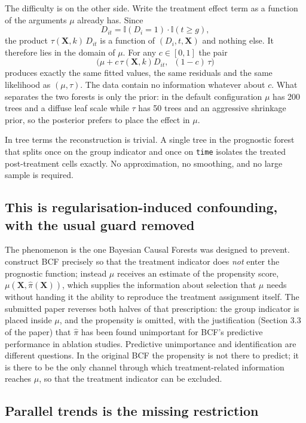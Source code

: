 \documentclass[11pt]{article}
\newcommand{\Xb}{\mathbf{X}}
\begin{document}
The difficulty is on the other side. Write the treatment effect term as a
function of the arguments $\mu$ already has. Since
\[
  D_{it} = \mathbb{I}(D_i = 1)\cdot\mathbb{I}(t \geq g),
\]
the product $\tau(\Xb, k)\,D_{it}$ is a function of $(D_i, t, \Xb)$ and nothing
else. It therefore lies in the domain of $\mu$. For any $c \in [0,1]$ the pair
\begin{equation}\label{eq:flat}
  \bigl(\mu + c\,\tau(\Xb,k)D_{it},\;\; (1-c)\,\tau\bigr)
\end{equation}
produces exactly the same fitted values, the same residuals and the same
likelihood as $(\mu, \tau)$. The data contain no information whatever about
$c$. What separates the two forests is only the prior: in the default
configuration $\mu$ has 200 trees and a diffuse leaf scale while $\tau$ has 50
trees and an aggressive shrinkage prior, so the posterior prefers to place the
effect in $\mu$.

In tree terms the reconstruction is trivial. A single tree in the prognostic
forest that splits once on the group indicator and once on \texttt{time}
isolates the treated post-treatment cells exactly. No approximation, no
smoothing, and no large sample is required.

\subsection{This is regularisation-induced confounding, with the usual guard removed}

The phenomenon is the one Bayesian Causal Forests was designed to prevent.
\citet{Hahn2020} construct BCF precisely so that the treatment indicator does
\emph{not} enter the prognostic function; instead $\mu$ receives an estimate of
the propensity score, $\mu(\Xb, \hat\pi(\Xb))$, which supplies the information
about selection that $\mu$ needs without handing it the ability to reproduce
the treatment assignment itself. The submitted paper reverses both halves of
that prescription: the group indicator is placed inside $\mu$, and the
propensity is omitted, with the justification (Section 3.3 of the paper) that
$\hat\pi$ has been found unimportant for BCF's predictive performance in
ablation studies. Predictive unimportance and identification are different
questions. In the original BCF the propensity is not there to predict; it is
there to be the only channel through which treatment-related information
reaches $\mu$, so that the treatment indicator can be excluded.

\subsection{Parallel trends is the missing restriction}
\end{document}
